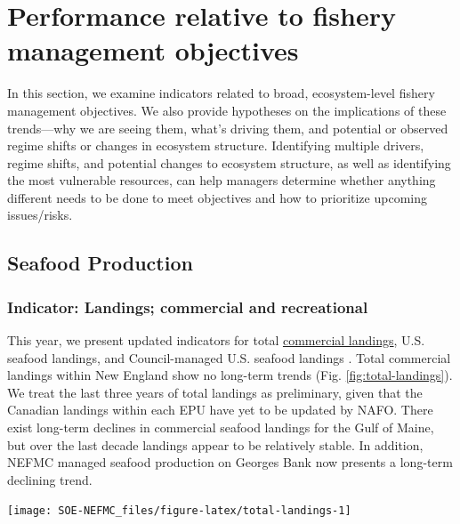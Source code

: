 \documentclass[
  10pt,
]{article}
\let\origfigure\figure
\let\endorigfigure\endfigure
\renewenvironment{figure}[1][2] {
    \expandafter\origfigure\expandafter[H]
} {
    \endorigfigure
}
\begin{document}
\hypertarget{performance-relative-to-fishery-management-objectives}{%
\section{Performance relative to fishery management objectives}\label{performance-relative-to-fishery-management-objectives}}

In this section, we examine indicators related to broad, ecosystem-level fishery management objectives. We also provide hypotheses on the implications of these trends---why we are seeing them, what's driving them, and potential or observed regime shifts or changes in ecosystem structure. Identifying multiple drivers, regime shifts, and potential changes to ecosystem structure, as well as identifying the most vulnerable resources, can help managers determine whether anything different needs to be done to meet objectives and how to prioritize upcoming issues/risks.

\hypertarget{seafood-production}{%
\subsection{Seafood Production}\label{seafood-production}}

\hypertarget{indicator-landings-commercial-and-recreational}{%
\subsubsection{Indicator: Landings; commercial and recreational}\label{indicator-landings-commercial-and-recreational}}

This year, we present updated indicators for total \href{https://noaa-edab.github.io/catalog/commercial-landings-and-revenue.html}{commercial landings}, U.S. seafood landings, and Council-managed U.S. seafood landings . Total commercial landings within New England show no long-term trends (Fig. \ref{fig:total-landings}). We treat the last three years of total landings as preliminary, given that the Canadian landings within each EPU have yet to be updated by NAFO. There exist long-term declines in commercial seafood landings for the Gulf of Maine, but over the last decade landings appear to be relatively stable. In addition, NEFMC managed seafood production on Georges Bank now presents a long-term declining trend.

\begin{figure}

{\centering \texttt{[image: SOE-NEFMC\_files/figure-latex/total-landings-1]} 

}

\caption{Total commercial landings (black), total U.S. seafood landings (blue), and New England managed U.S. seafood landings (red) for Georges Bank (GB) and the Gulf of Maine (GOM). Open circles represent years that are lacking NAFO (foreign) data.}\label{fig:total-landings}
\end{figure}
\end{document}

